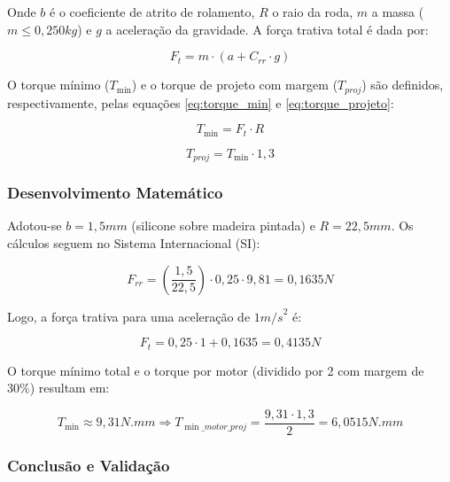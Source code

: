 Onde $b$ é o coeficiente de atrito de rolamento, $R$ o raio da roda, $m$ a massa ($m \le 0,250{kg}$) e $g$ a aceleração da gravidade. A força trativa total é dada por:

\begin{equation}
    F_t = m \cdot (a + C_{rr} \cdot g)
\end{equation}

O torque mínimo ($T_{\min}$) e o torque de projeto com margem ($T_{{proj}}$) são definidos, respectivamente, pelas equações \ref{eq:torque_min} e \ref{eq:torque_projeto}:

\begin{equation}
    T_{\min} = F_t \cdot R
    \label{eq:torque_min}
\end{equation}

\begin{equation}
    T_{{proj}} = T_{\min} \cdot 1,3
    \label{eq:torque_projeto}
\end{equation}

\subsubsection{Desenvolvimento Matemático}

Adotou-se $b = 1,5{mm}$ (silicone sobre madeira pintada) e $R = 22,5{mm}$. Os cálculos seguem no Sistema Internacional (SI):

\begin{equation}
    F_{rr} = \left(\frac{1,5}{22,5}\right) \cdot 0,25 \cdot 9,81 = 0,1635{N}
\end{equation}

Logo, a força trativa para uma aceleração de $1{m/s}^2$ é:

\begin{equation}
    F_t = 0,25 \cdot 1 + 0,1635 = 0,4135{N}
\end{equation}

O torque mínimo total e o torque por motor (dividido por 2 com margem de 30\%) resultam em:

\begin{equation}
    T_{\min} \approx 9,31{N.mm} \Longrightarrow T_{\min\_{motor\_proj}} = \frac{9,31 \cdot 1,3}{2} = 6,0515{N.mm}
\end{equation}

\subsubsection{Conclusão e Validação}

